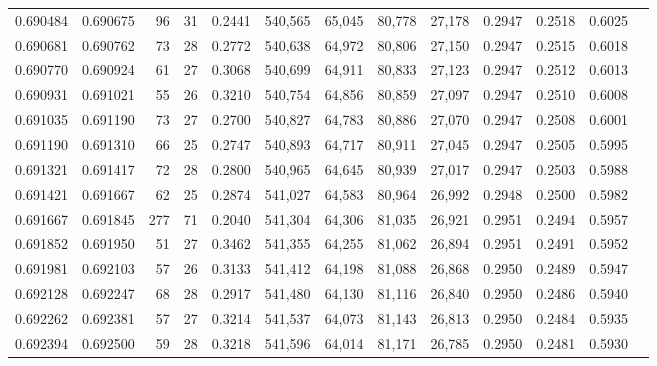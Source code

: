 \begin{tabular}{rrrrrrrrrrrrr}
0.690484 & 0.690675 &     96 &    31 &                                     0.2441 & 540,565 &  65,045 &  80,778 &  27,178 & 0.2947 & 0.2518 & 0.6025 \\
0.690681 & 0.690762 &     73 &    28 &                                     0.2772 & 540,638 &  64,972 &  80,806 &  27,150 & 0.2947 & 0.2515 & 0.6018 \\
0.690770 & 0.690924 &     61 &    27 &                                     0.3068 & 540,699 &  64,911 &  80,833 &  27,123 & 0.2947 & 0.2512 & 0.6013 \\
0.690931 & 0.691021 &     55 &    26 &                                     0.3210 & 540,754 &  64,856 &  80,859 &  27,097 & 0.2947 & 0.2510 & 0.6008 \\
0.691035 & 0.691190 &     73 &    27 &                                     0.2700 & 540,827 &  64,783 &  80,886 &  27,070 & 0.2947 & 0.2508 & 0.6001 \\
0.691190 & 0.691310 &     66 &    25 &                                     0.2747 & 540,893 &  64,717 &  80,911 &  27,045 & 0.2947 & 0.2505 & 0.5995 \\
0.691321 & 0.691417 &     72 &    28 &                                     0.2800 & 540,965 &  64,645 &  80,939 &  27,017 & 0.2947 & 0.2503 & 0.5988 \\
0.691421 & 0.691667 &     62 &    25 &                                     0.2874 & 541,027 &  64,583 &  80,964 &  26,992 & 0.2948 & 0.2500 & 0.5982 \\
0.691667 & 0.691845 &    277 &    71 &                                     0.2040 & 541,304 &  64,306 &  81,035 &  26,921 & 0.2951 & 0.2494 & 0.5957 \\
0.691852 & 0.691950 &     51 &    27 &                                     0.3462 & 541,355 &  64,255 &  81,062 &  26,894 & 0.2951 & 0.2491 & 0.5952 \\
0.691981 & 0.692103 &     57 &    26 &                                     0.3133 & 541,412 &  64,198 &  81,088 &  26,868 & 0.2950 & 0.2489 & 0.5947 \\
0.692128 & 0.692247 &     68 &    28 &                                     0.2917 & 541,480 &  64,130 &  81,116 &  26,840 & 0.2950 & 0.2486 & 0.5940 \\
0.692262 & 0.692381 &     57 &    27 &                                     0.3214 & 541,537 &  64,073 &  81,143 &  26,813 & 0.2950 & 0.2484 & 0.5935 \\
0.692394 & 0.692500 &     59 &    28 &                                     0.3218 & 541,596 &  64,014 &  81,171 &  26,785 & 0.2950 & 0.2481 & 0.5930 \\

\end{tabular}
